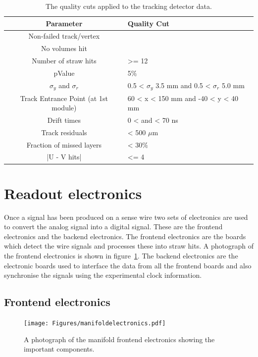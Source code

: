 \begin{table}[h!]
\begin{center}
 \begin{tabular}{||c | m{5cm}||} 
 \hline
 Parameter & Quality Cut \\ [0.5ex] 
 \hline\hline
 Non-failed track/vertex &  \\ 
 \hline
 No volumes hit & \\
 \hline
 Number of straw hits  & >= 12 \\ 
 \hline
 pValue & 5$\%$ \\ 
 \hline
 $\sigma_{y}$ and $\sigma_{r}$ & 0.5 < $\sigma_{y}$ 3.5 mm and 0.5 < $\sigma_{r}$ 5.0 mm\\
 \hline
 Track Entrance Point (at 1st module) & 60 < x < 150 mm and -40 < y < 40 mm \\
 \hline
Drift times & 0 < and < 70 ns \\ 
 \hline
 Track residuals & < 500 $\mu$m \\
 \hline
 Fraction of missed layers & < 30$\%$ \\ 
 \hline
 |U - V hits| & <= 4 \\ [1ex] 
 \hline
\end{tabular}
\caption{The quality cuts applied to the tracking detector data.}
\label{table:qualitycuts}
\end{center}
\end{table}

\section{Readout electronics}

Once a signal has been produced on a sense wire two sets of electronics are used to convert the analog signal into a digital signal. These are the frontend electronics and the backend electronics. The frontend electronics are the boards which detect the wire signals and processes these into straw hits. A photograph of the frontend electronics is shown in figure~\ref{fig:manifoldelectronics}. The backend electronics are the electronic boards used to interface the data from all the frontend boards and also synchronise the signals using the experimental clock information.

\subsection{Frontend electronics}

\begin{figure}[th]
\centering
\texttt{[image: Figures/manifoldelectronics.pdf]}
\decoRule
\caption{A photograph of the manifold frontend electronics showing the important components.}
\label{fig:manifoldelectronics}
\end{figure}

